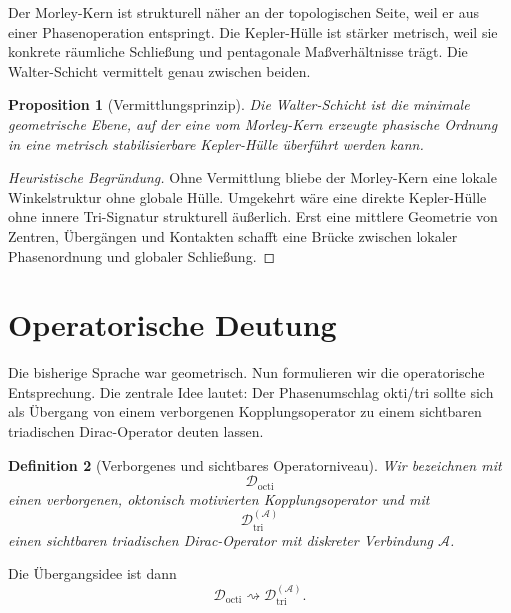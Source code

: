 \documentclass[11pt,a4paper]{article}
\newtheorem{definition}{Definition}[section]
\newtheorem{proposition}[definition]{Proposition}
\theoremstyle{remark}
\newcommand{\Dcal}{\mathcal{D}}
\newcommand{\Acal}{\mathcal{A}}
\begin{document}
	Der Morley-Kern ist strukturell näher an der topologischen Seite, weil er aus einer Phasenoperation entspringt. Die Kepler-Hülle ist stärker metrisch, weil sie konkrete räumliche Schließung und pentagonale Maßverhältnisse trägt. Die Walter-Schicht vermittelt genau zwischen beiden.
	
	\begin{proposition}[Vermittlungsprinzip]
		Die Walter-Schicht ist die minimale geometrische Ebene, auf der eine vom Morley-Kern erzeugte phasische Ordnung in eine metrisch stabilisierbare Kepler-Hülle überführt werden kann.
	\end{proposition}
	
	\begin{proof}[Heuristische Begründung]
		Ohne Vermittlung bliebe der Morley-Kern eine lokale Winkelstruktur ohne globale Hülle. Umgekehrt wäre eine direkte Kepler-Hülle ohne innere Tri-Signatur strukturell äußerlich. Erst eine mittlere Geometrie von Zentren, Übergängen und Kontakten schafft eine Brücke zwischen lokaler Phasenordnung und globaler Schließung.
	\end{proof}
	
	\section{Operatorische Deutung}
	
	Die bisherige Sprache war geometrisch. Nun formulieren wir die operatorische Entsprechung. Die zentrale Idee lautet: Der Phasenumschlag okti/tri sollte sich als Übergang von einem verborgenen Kopplungsoperator zu einem sichtbaren triadischen Dirac-Operator deuten lassen.
	
	\begin{definition}[Verborgenes und sichtbares Operatorniveau]
		Wir bezeichnen mit
		\begin{equation}
			\Dcal_{\mathrm{octi}}
		\end{equation}
		einen verborgenen, oktonisch motivierten Kopplungsoperator und mit
		\begin{equation}
			\Dcal_{\mathrm{tri}}^{(\Acal)}
		\end{equation}
		einen sichtbaren triadischen Dirac-Operator mit diskreter Verbindung $\Acal$.
	\end{definition}
	
	Die Übergangsidee ist dann
	\begin{equation}
		\Dcal_{\mathrm{octi}} \rightsquigarrow \Dcal_{\mathrm{tri}}^{(\Acal)}.
	\end{equation}
	
\end{document}
